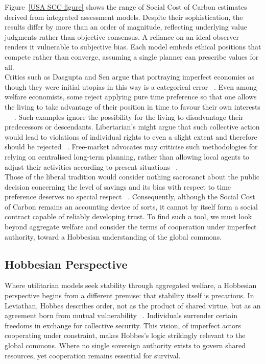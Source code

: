 \documentclass[10pt, oneside]{article}   	%
\begin{document}
Figure~\ref{USA SCC figure} shows the range of Social Cost of Carbon estimates derived from integrated assessment models.
Despite their sophistication, the results differ by more than an order of magnitude, reflecting underlying value judgments rather than objective consensus.
A reliance on an ideal observer renders it vulnerable to subjective bias.
Each model embeds ethical positions that compete rather than converge, assuming a single planner can prescribe values for all.\\

Critics such as Dasgupta and Sen argue that portraying imperfect economies as though they were initial utopias in this way is a categorical error ~\cite{as1}.
Even among welfare economists, some reject applying pure time preference so that one allows the living to take advantage of their position in time to favour their own interests ~\cite{hs1} ~\cite{fr1}.
Such examples ignore the possibility for the living to disadvantage their predecessors or descendants.
Libertarian's might argue that such collective action would lead to violations of individual rights to even a slight extent and therefore should be rejected ~\cite{rn1}.
Free-market advocates may criticise such methodologies for relying on centralised long-term planning, rather than allowing local agents to adjust their activities according to present situations ~\cite{fh1}.\\

Those of the liberal tradition would consider nothing sacrosanct about the public decision concerning the level of savings and its bias with respect to time preference deserves no special respect ~\cite{jr1}.
Consequently, although the Social Cost of Carbon remains an accounting device of sorts, it cannot by itself form a social contract capable of reliably developing trust.
To find such a tool, we must look beyond aggregate welfare and consider the terms of cooperation under imperfect authority, toward a Hobbesian understanding of the global commons.\\

\subsection{Hobbesian Perspective}

Where utilitarian models seek stability through aggregated welfare, a Hobbesian perspective begins from a different premise: that stability itself is precarious.
In Leviathan, Hobbes describes order, not as the product of shared virtue, but as an agreement born from mutual vulnerability ~\cite{th1}.
Individuals surrender certain freedoms in exchange for collective security.
This vision, of imperfect actors cooperating under constraint, makes Hobbes’s logic strikingly relevant to the global commons.
Where no single sovereign authority exists to govern shared resources, yet cooperation remains essential for survival.\\
\end{document}

